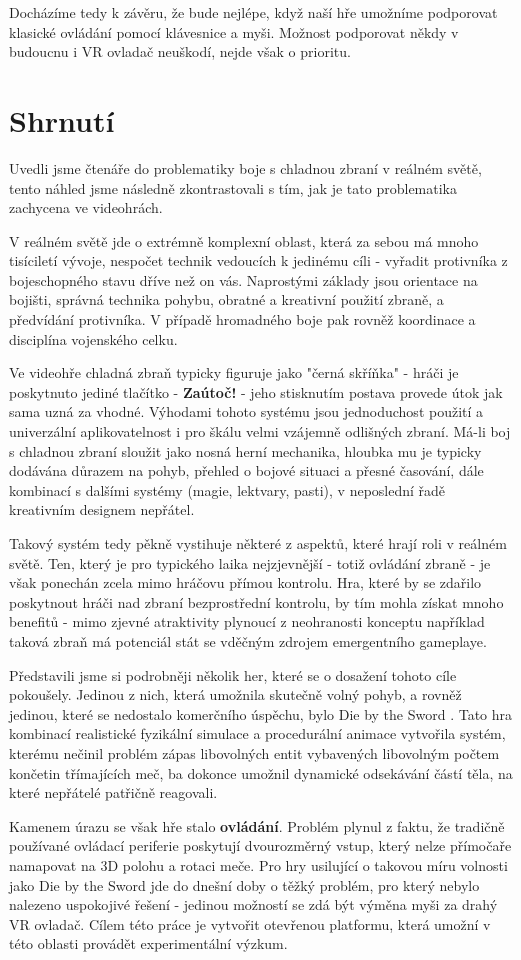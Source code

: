 Docházíme tedy k závěru, že bude nejlépe, když naší hře umožníme podporovat klasické ovládání pomocí klávesnice a myši. Možnost podporovat někdy v budoucnu i \acs{VR} ovladač neuškodí, nejde však o prioritu.

\section{Shrnutí}

Uvedli jsme čtenáře do problematiky boje s chladnou zbraní v reálném světě, tento náhled jsme následně zkontrastovali s tím, jak je tato problematika zachycena ve videohrách.

V reálném světě jde o extrémně komplexní oblast, která za sebou má mnoho tisíciletí vývoje, nespočet technik vedoucích k jedinému cíli - vyřadit protivníka z bojeschopného stavu dříve než on vás. Naprostými základy jsou orientace na bojišti, správná technika pohybu, obratné a kreativní použití zbraně, a předvídání protivníka. V případě hromadného boje pak rovněž koordinace a disciplína vojenského celku. 

Ve videohře chladná zbraň typicky figuruje jako "černá skříňka" - hráči je poskytnuto jediné tlačítko - \textbf{Zaútoč!} - jeho stisknutím postava provede útok jak sama uzná za vhodné. Výhodami tohoto systému jsou jednoduchost použití a univerzální aplikovatelnost i pro škálu velmi vzájemně odlišných zbraní. Má-li boj s chladnou zbraní sloužit jako nosná herní mechanika, hloubka mu je typicky dodávána důrazem na pohyb, přehled o bojové situaci a přesné časování, dále kombinací s dalšími systémy (magie, lektvary, pasti), v neposlední řadě kreativním designem nepřátel.

Takový systém tedy pěkně vystihuje některé z aspektů, které hrají roli v reálném světě. Ten, který je pro typického laika nejzjevnější - totiž ovládání zbraně - je však ponechán zcela mimo hráčovu přímou kontrolu. Hra, které by se zdařilo poskytnout hráči nad zbraní bezprostřední kontrolu, by tím mohla získat mnoho benefitů - mimo zjevné atraktivity plynoucí z neohranosti konceptu například taková zbraň má potenciál stát se vděčným zdrojem emergentního gameplaye.

Představili jsme si podrobněji několik her, které se o dosažení tohoto cíle pokoušely. Jedinou z nich, která umožnila skutečně volný pohyb, a rovněž jedinou, které se nedostalo komerčního úspěchu, bylo Die by the Sword \cite{DieByTheSword}. Tato hra kombinací realistické fyzikální simulace a procedurální animace vytvořila systém, kterému nečinil problém zápas libovolných entit vybavených libovolným počtem končetin třímajících meč, ba dokonce umožnil dynamické odsekávání částí těla, na které nepřátelé patřičně reagovali. 

Kamenem úrazu se však hře stalo \textbf{ovládání}. Problém plynul z faktu, že tradičně používané ovládací periferie poskytují dvourozměrný vstup, který nelze přímočaře namapovat na 3D polohu a rotaci meče. Pro hry usilující o takovou míru volnosti jako Die by the Sword jde do dnešní doby o těžký problém, pro který nebylo nalezeno uspokojivé řešení - jedinou možností se zdá být výměna myši za drahý \acs{VR} ovladač. Cílem této práce je vytvořit otevřenou platformu, která umožní v této oblasti provádět experimentální výzkum.

